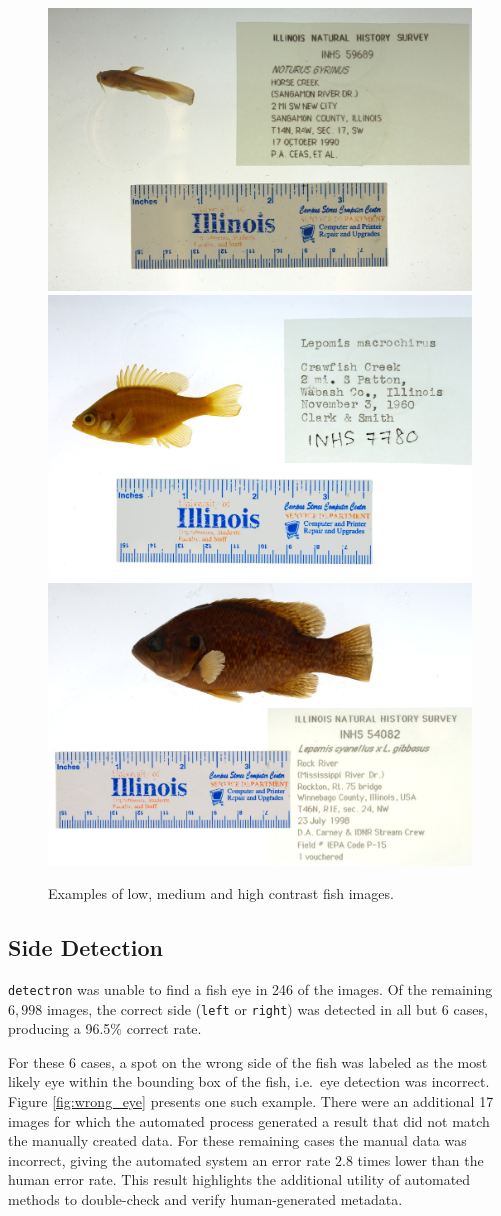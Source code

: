 \documentclass[conference]{IEEEtran}
\begin{document}

\begin{figure}[t]
  \centering
  \includegraphics[width=0.31\linewidth]{images/dark}
  \includegraphics[width=0.31\linewidth]{images/normal}
  \includegraphics[width=0.31\linewidth]{images/bright}
  \caption{Examples of low, medium and high contrast fish images.}
  \label{fig:contrast}
\end{figure}

\subsection{Side Detection}
\verb|detectron| was unable to find a fish eye
in 246 of the images. Of the remaining \(6,998\) images, the correct side
(\verb|left| or \verb|right|) was detected in all but 6 cases, producing
a 96.5\% correct rate.

For these 6 cases, a spot on the wrong side of the fish was labeled as the
most likely eye within the bounding box of the fish, i.e.~eye detection 
was incorrect. Figure \ref{fig:wrong_eye} presents one such example.
There were an additional 17 images for which the automated process generated a result that did not match the manually created data. For these remaining cases the manual data was incorrect, giving the automated system an error rate \(2.8\) times lower than the human error rate.
This result highlights the additional utility of automated methods to
double-check and verify human-generated metadata.
\end{document}

